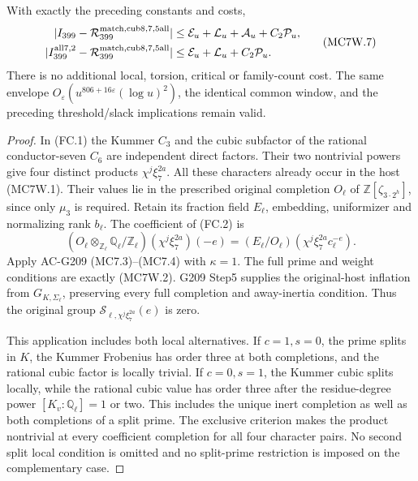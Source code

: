 \begin{theorem}
\[\]
With exactly the preceding constants and costs,
\[
 \begin{aligned}
 |I_{399}-\mathcal R_{399}^{\rm match,cub8,7,5all}|&\leq
        \mathcal E_u+\mathcal L_u+\mathcal A_u+C_2\mathcal P_u,\\
 |I_{399}^{\rm all7,2}-\mathcal R_{399}^{\rm match,cub8,7,5all}|&\leq
        \mathcal E_u+\mathcal L_u+C_2\mathcal P_u.
 \end{aligned}\tag{MC7W.7}
\]
There is no additional local, torsion, critical or family-count cost.
The same envelope $O_\varepsilon(u^{806+16\varepsilon}(\log u)^2)$,
the identical common window, and the preceding threshold/slack
implications remain valid.
\end{theorem}

\begin{proof}
In (FC.1) the Kummer $C_3$ and the cubic subfactor of the
rational conductor-seven $C_6$ are independent direct factors.
Their two nontrivial powers give four distinct products
$\chi^j\xi_7^{2a}$. All these characters already occur in
the host (MC7W.1). Their values lie in the prescribed original
completion $O_\ell$ of $\mathbb Z[\zeta_{3\cdot2^h}]$,
since only $\mu_3$ is required.
Retain its fraction field $E_\ell$, embedding, uniformizer
and normalizing rank $b_\ell$. The coefficient of (FC.2) is
\[
 (O_\ell\otimes_{\mathbb Z_\ell}\mathbb Q_\ell/\mathbb Z_\ell)
                       (\chi^j\xi_7^{2a})(-e)
       =(E_\ell/O_\ell)(\chi^j\xi_7^{2a}c_\ell^{-e}).
 \tag{MC7W.8}
\]
Apply AC-G209 (MC7.3)--(MC7.4) with $\kappa=1$.
The full prime and weight conditions are exactly (MC7W.2).
G209 Step5 supplies the original-host inflation from
$G_{K,\Sigma_\ell}$, preserving every full completion and
away-inertia condition. Thus the original group
$\mathcal S_{\ell,\chi^j\xi_7^{2a}}(e)$ is zero.

This application includes both local alternatives. If $c=1,s=0$,
the prime splits in $K$, the Kummer Frobenius has order three
at both completions, and the rational cubic factor is locally trivial.
If $c=0,s=1$, the Kummer cubic splits locally, while the rational
cubic value has order three after the residue-degree power
$[K_v:\mathbb Q_\ell]=1$ or two. This includes the unique
inert completion as well as both completions of a split prime.
The exclusive criterion makes the product nontrivial at every
coefficient completion for all four character pairs.
No second split local condition is omitted and no split-prime
restriction is imposed on the complementary case.


\end{proof}

